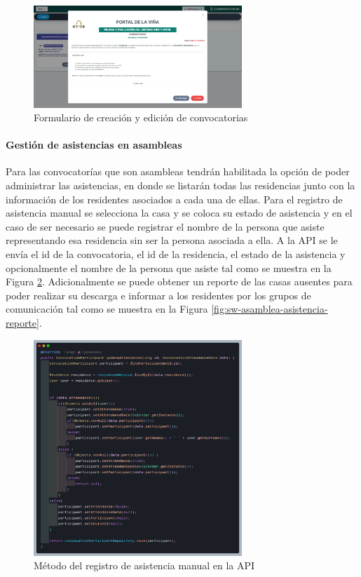 \begin{figure}[H]
    \centering
    \includegraphics[width=0.7\textwidth]{resources/images/sw-convocatorias-comunicado}
    \caption{Formulario de creación y edición de convocatorias}
    \label{fig:sw-convocatorias-comunicado}
\end{figure}

\paragraph{Gestión de asistencias en asambleas}

Para las convocatorías que son asambleas tendrán habilitada la opción de poder administrar las asistencias, en donde se listarán todas las residencias junto con la información de los residentes asociados a cada una de ellas.
Para el registro de asistencia manual se selecciona la casa y se coloca su estado de asistencia y en el caso de ser necesario se puede registrar el nombre de la persona que asiste representando esa residencia sin ser la persona asociada a ella.
A la API se le envía el id de la convocatoria, el id de la residencia, el estado de la asistencia y opcionalmente el nombre de la persona que asiste tal como se muestra en la Figura \ref{fig:api-attendance-create}.
Adicionalmente se puede obtener un reporte de las casas ausentes para poder realizar su descarga e informar a los residentes por los grupos de comunicación tal como se muestra en la Figura \ref{fig:sw-asamblea-asistencia-reporte}.

\begin{figure}[H]
    \centering
    \includegraphics[width=0.7\textwidth]{resources/images/api-asamblea-asistencia-manual}
    \caption{Método del registro de asistencia manual en la API}
    \label{fig:api-attendance-create}
\end{figure}

